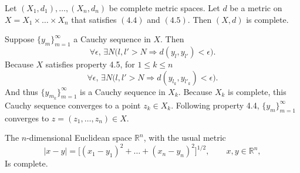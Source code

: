 \documentclass[nobib,notoc]{tufte-handout}
\begin{document}
\begin{thm}
	Let \((X_1,d_1),\ldots,(X_n,d_n)\) be complete metric spaces. Let \(d\) be a metric on \(X=X_1\times\ldots\times X_n\) that satisfies \((4.4)\) and \((4.5)\). Then \((X,d)\) is complete.
	\begin{IEEEproof}
		Suppose \(\{y_m\}_{m=1}^{\infty}\) a Cauchy sequence in \(X\). Then
		\begin{equation*}
			\forall\epsilon,\,\exists N\big(l,l'>N\Rightarrow d(y_l,y_{l'})<\epsilon\big).
		\end{equation*}
		Because \(X\) satisfies property 4.5, for \(1\leq k\leq n\)
		\begin{equation*}
			\forall\epsilon,\,\exists N\big(l,l'>N\Rightarrow d(y_{l_k},y_{l'_k})<\epsilon\big).
		\end{equation*}
	And thus \(\{y_{m_k}\}_{m=1}^{\infty}\) is a Cauchy sequence in \(X_k\). Because \(X_k\) is complete, this Cauchy sequence converges to a point \(z_k\in X_k\). Following property 4.4, \(\{y_m\}_{m=1}^{\infty}\) converges to \(z=(z_1,\ldots,z_n)\in X\).
	\end{IEEEproof}
\end{thm}
\begin{cor}
	The \(n\)-dimensional Euclidean space \(\mathbb{R}^n\), with the usual metric
	\begin{equation*}
		\lvert x-y\rvert=\big[(x_1-y_1)^2+\ldots+(x_n-y_n)^2\big]^{1/2},\qquad x,y\in\mathbb{R}^n,
	\end{equation*}
	Is complete.
\end{cor}
\end{document}
